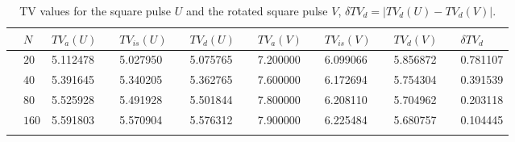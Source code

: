 \documentclass[reqno,a4paper,12pt]{amsart}
\begin{document}
\begin{table}[htb!]\centering
\begin{tabular}{@{}cllclclclclclcl@{}}\toprule
& $N$ & $TV_a(U)$ && $TV_{is}(U)$ && $TV_{d}(U)$ && $TV_a(V)$ && $TV_{is}(V)$ && $TV_{d}(V)$ && $\delta TV_{d}$ \\ \midrule
& $20$ & 5.112478 && 5.027950 && 5.075765 && 7.200000 && 6.099066 && 5.856872 && 0.781107 \\
& $40$ & 5.391645 && 5.340205 && 5.362765 && 7.600000 && 6.172694 && 5.754304 && 0.391539 \\
& $80$ & 5.525928 && 5.491928 && 5.501844 && 7.800000 && 6.208110 && 5.704962 && 0.203118 \\
& $160$ & 5.591803 && 5.570904 && 5.576312 && 7.900000 && 6.225484 && 5.680757 && 0.104445 \\
\bottomrule\\
\end{tabular}
\caption{TV values for the square pulse $U$ and the rotated square pulse $V$, $\delta TV_{d} = \vert TV_{d}(U) - TV_{d}(V) \vert$.}
\label{table:1}
\end{table}
\end{document}

